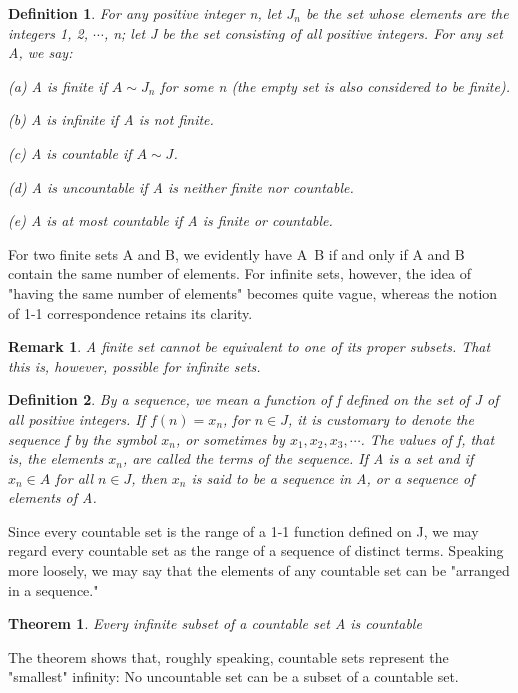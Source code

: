 \documentclass{article}
\newtheorem{defi}{Definition}
\newtheorem{theo}{Theorem}
\newtheorem{rem}{Remark}
\begin{document}
\begin{defi}
	For any positive integer n, let $ J_n $ be the set whose elements are the integers 1, 2, $\cdots$, n; let J be the set consisting of all positive integers. For any set A, we say:
	
	(a) A is finite if $ A\sim J_n $ for some n (the empty set is also considered to be finite).
	
	(b) A is infinite if A is not finite.
	
	(c) A is countable if $ A\sim J $.
	
	(d) A is uncountable if A is neither finite nor countable.
	
	(e) A is at most countable if A is finite or countable.
\end{defi}

For two finite sets A and B, we evidently have A~B if and only if A and B contain the same number of elements. For infinite sets, however, the idea of "having the same number of elements" becomes quite vague, whereas the notion of 1-1 correspondence retains its clarity.

\begin{rem}
	A finite set cannot be equivalent to one of its proper subsets. That this is, however, possible for infinite sets.
\end{rem}

\begin{defi}
	By a sequence, we mean a function of f defined on the set of J of all positive integers. If $ f(n)=x_n $, for $ n\in J $, it is customary to denote the sequence f by the symbol {$ x_n $}, or sometimes by $x_1,x_2,x_3,\cdots$. The values of f, that is, the elements $ x_n $, are called the terms of the sequence. If A is a set and if $ x_n\in A $ for all $ n\in J $, then {$ x_n $} is said to be a sequence in A, or a sequence of elements of A.
\end{defi}

Since every countable set is the range of a 1-1 function defined on J, we may regard every countable set as the range of a sequence of distinct terms. Speaking more loosely, we may say that the elements of any countable set can be "arranged in a sequence."

\begin{theo}
	Every infinite subset of a countable set A is countable
\end{theo}

The theorem shows that, roughly speaking, countable sets represent the "smallest" infinity: No uncountable set can be a subset of a countable set.
\end{document}
